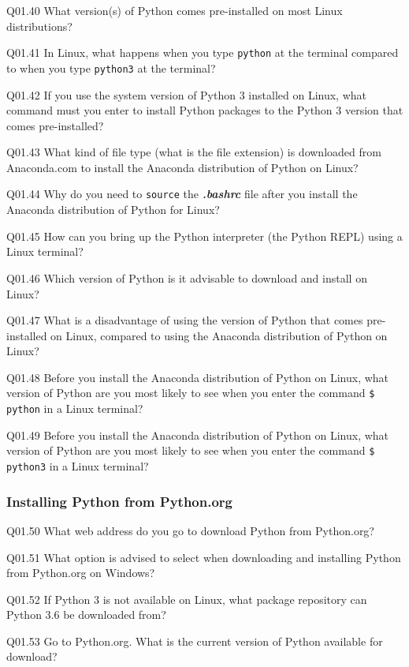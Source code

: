 \documentclass{book}
\newenvironment{problems}{}{}  %
\begin{document}
    
        \begin{problems}
        Q01.40 What version(s) of Python comes pre-installed on most Linux
distributions?

Q01.41 In Linux, what happens when you type \lstinline!python! at the
terminal compared to when you type \lstinline!python3! at the terminal?

Q01.42 If you use the system version of Python 3 installed on Linux,
what command must you enter to install Python packages to the Python 3
version that comes pre-installed?

Q01.43 What kind of file type (what is the file extension) is downloaded
from Anaconda.com to install the Anaconda distribution of Python on
Linux?

Q01.44 Why do you need to \lstinline!source! the \textbf{\emph{.bashrc}}
file after you install the Anaconda distribution of Python for Linux?

Q01.45 How can you bring up the Python interpreter (the Python REPL)
using a Linux terminal?

Q01.46 Which version of Python is it advisable to download and install
on Linux?

Q01.47 What is a disadvantage of using the version of Python that comes
pre-installed on Linux, compared to using the Anaconda distribution of
Python on Linux?

Q01.48 Before you install the Anaconda distribution of Python on Linux,
what version of Python are you most likely to see when you enter the
command \lstinline!$ python! in a Linux terminal?

Q01.49 Before you install the Anaconda distribution of Python on Linux,
what version of Python are you most likely to see when you enter the
command \lstinline!$ python3! in a Linux terminal?
        \end{problems}

    




    
        \subsubsection{Installing Python from
Python.org}\label{installing-python-from-python.org}
    




    
        \begin{problems}
        Q01.50 What web address do you go to download Python from Python.org?

Q01.51 What option is advised to select when downloading and installing
Python from Python.org on Windows?

Q01.52 If Python 3 is not available on Linux, what package repository
can Python 3.6 be downloaded from?

Q01.53 Go to Python.org. What is the current version of Python available
for download?
        \end{problems}
\end{document}
